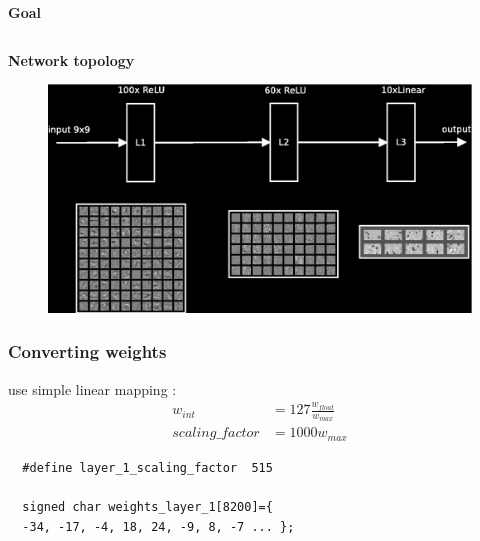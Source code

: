 \documentclass[xcolor=dvipsnames]{beamer}
\begin{document}
\begin{frame}{\bf Goal}
\begin{columns}
\begin{column}{0.5\textwidth}
\end{column}
\end{columns}


\end{frame}



\begin{frame}{\bf Network topology}

\begin{figure}
  \includegraphics[width=\linewidth]{nn_topology_trained_black.eps}
\end{figure}

\end{frame}

\begin{frame}


\end{frame}


\begin{frame}[fragile]
\frametitle{\bf Converting weights}

use simple linear mapping : \\
\begin{align*}
  w_{int} &= 127\frac{w_{float}}{w_{max}} \\
  scaling\_factor &= 1000w_{max}
\end{align*}
\bigskip
  \lstset{language=C++}
\begin{lstlisting}
  #define layer_1_scaling_factor  515

  signed char weights_layer_1[8200]={
  -34, -17, -4, 18, 24, -9, 8, -7 ... };
\end{lstlisting}

\end{frame}
\end{document}
